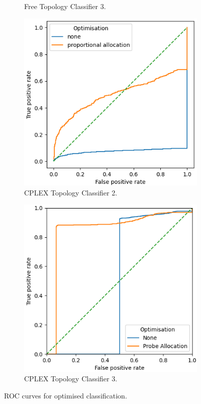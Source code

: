 \begin{figure}[H]
\begin{subfigure}[H]{0.475\textwidth}
        \caption{Free Topology Classifier 3.}
    \end{subfigure}
    \begin{subfigure}[H]{0.475\textwidth}
        \includegraphics[width=\textwidth]{figs/results/norway_ac2_opt.png}
        \caption{CPLEX Topology Classifier 2.}
    \end{subfigure}
    \begin{subfigure}[H]{0.475\textwidth}
        \includegraphics[width=\textwidth]{figs/results/norway_ac3_opt.png}
        \caption{CPLEX Topology Classifier 3.}
    \end{subfigure}
    \caption{ROC curves for optimised classification.}
    \label{fig:RprobeoptROCcurves}
\end{figure}

